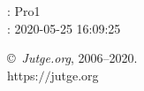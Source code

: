 \documentclass[11pt]{article}
\begin{document}
    \newcommand{\SampleTwoCol}{\SampleTwoColInputOutput{sample-000}{1}\SampleTwoColInputOutput{sample-004}{2}\SampleTwoColInputOutput{sample-005}{3}}
    \newcommand{\SampleOneCol}{\SampleOneColInputOutput{sample-000}{1}\SampleOneColInputOutput{sample-004}{2}\SampleOneColInputOutput{sample-005}{3}}

    \ProblemInformation
    \Author: Pro1\\    
    \Generation: 2020-05-25 16:09:25

    \bigskip

    \copyright\ \emph{Jutge.org}, 2006--2020. \\
    https:$/\!\!/$jutge.org
\end{document}
